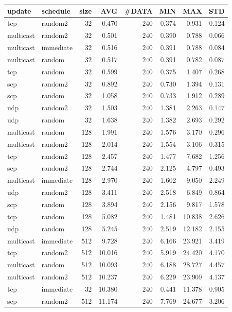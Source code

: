 \begin{tabular}{|llrrrrrr|}
\hline
{\sc update}&{\sc schedule}&{\sc size}&{\sc AVG}&{\sc\#DATA}&{\sc MIN}&{\sc MAX}&{\sc STD}\\
\hline
tcp & random2 & 32 &  0.470 & 240 & 0.374 & 0.931 & 0.124\\
multicast & random2 & 32 &  0.501 & 240 & 0.390 & 0.788 & 0.066\\
multicast & immediate & 32 &  0.516 & 240 & 0.391 & 0.788 & 0.084\\
multicast & random & 32 &  0.517 & 240 & 0.391 & 0.782 & 0.087\\
tcp & random & 32 &  0.599 & 240 & 0.375 & 1.407 & 0.268\\
scp & random2 & 32 &  0.892 & 240 & 0.730 & 1.394 & 0.131\\
scp & random & 32 &  1.058 & 240 & 0.733 & 1.912 & 0.289\\
udp & random2 & 32 &  1.503 & 240 & 1.381 & 2.263 & 0.147\\
udp & random & 32 &  1.638 & 240 & 1.382 & 2.693 & 0.292\\
multicast & random & 128 &  1.991 & 240 & 1.576 & 3.170 & 0.296\\
multicast & random2 & 128 &  2.014 & 240 & 1.554 & 3.106 & 0.315\\
tcp & random2 & 128 &  2.457 & 240 & 1.477 & 7.682 & 1.256\\
scp & random2 & 128 &  2.744 & 240 & 2.125 & 4.797 & 0.493\\
multicast & immediate & 128 &  2.970 & 240 & 1.602 & 9.050 & 2.249\\
udp & random2 & 128 &  3.411 & 240 & 2.518 & 6.849 & 0.864\\
scp & random & 128 &  3.894 & 240 & 2.156 & 9.817 & 1.578\\
tcp & random & 128 &  5.082 & 240 & 1.481 & 10.838 & 2.626\\
udp & random & 128 &  5.245 & 240 & 2.519 & 12.182 & 2.155\\
multicast & immediate & 512 &  9.728 & 240 & 6.166 & 23.921 & 3.419\\
tcp & random2 & 512 &  10.016 & 240 & 5.919 & 24.420 & 4.170\\
multicast & random & 512 &  10.093 & 240 & 6.188 & 28.727 & 4.457\\
multicast & random2 & 512 &  10.237 & 240 & 6.229 & 23.909 & 4.137\\
tcp & immediate & 32 &  10.380 & 240 & 0.441 & 11.378 & 0.905\\
scp & random2 & 512 &  11.174 & 240 & 7.769 & 24.677 & 3.206\\

\end{tabular}
